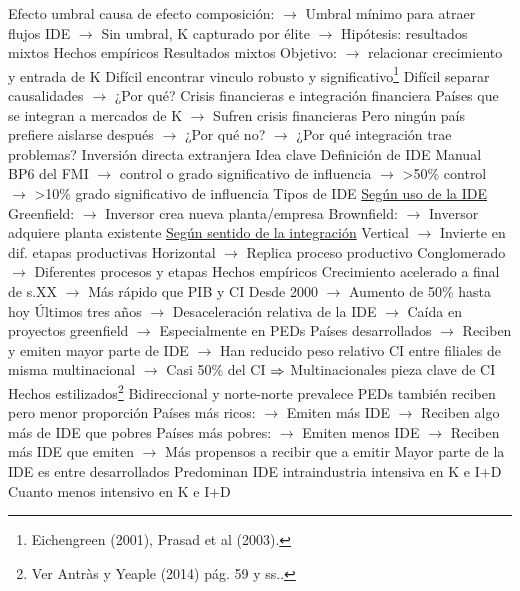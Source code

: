 \documentclass{nuevotema}
\begin{document}
\begin{esquemal}
				\4 Efecto umbral causa de efecto composición:
				\4[] $\to$ Umbral mínimo para atraer flujos IDE
				\4[] $\to$ Sin umbral, K capturado por élite
				\4[] $\to$ Hipótesis: resultados mixtos
			\3 Hechos empíricos
				\4 Resultados mixtos
				\4[] Objetivo:
				\4[] $\to$ relacionar crecimiento y entrada de K
				\4[] Difícil encontrar vinculo robusto y significativo\footnote{Eichengreen (2001), Prasad et al (2003).}
				\4 Difícil separar causalidades
				\4[] $\to$ ¿Por qué?
				\4 Crisis financieras e integración financiera
				\4[] Países que se integran a mercados de K
				\4[] $\to$ Sufren crisis financieras
				\4[] Pero ningún país prefiere aislarse después
				\4[] $\to$ ¿Por qué no?
				\4[] $\to$ ¿Por qué integración trae problemas?
		\2 Inversión directa extranjera
			\3 Idea clave
				\4 Definición de IDE
				\4[] Manual BP6 del FMI
				\4[] $\to$ control o grado significativo de influencia
				\4[] $\to$ >50\% control
				\4[] $\to$ >10\% grado significativo de influencia
				\4 Tipos de IDE
				\4[] \underline{Según uso de la IDE}
				\4[] Greenfield:
				\4[] $\to$ Inversor crea nueva planta/empresa
				\4[] Brownfield:
				\4[] $\to$ Inversor adquiere planta existente
				\4[] \underline{Según sentido de la integración}
				\4[] Vertical
				\4[] $\to$ Invierte en dif. etapas productivas
				\4[] Horizontal
				\4[] $\to$ Replica proceso productivo
				\4[] Conglomerado
				\4[] $\to$ Diferentes procesos y etapas
				\4 Hechos empíricos
				\4[] Crecimiento acelerado a final de s.XX
				\4[] $\to$ Más rápido que PIB y CI
				\4[] Desde 2000
				\4[] $\to$ Aumento de 50\% hasta hoy
				\4[] Últimos tres años
				\4[] $\to$ Desaceleración relativa de la IDE
				\4[] $\to$ Caída en proyectos greenfield
				\4[] $\to$ Especialmente en PEDs
				\4[] Países desarrollados
				\4[] $\to$ Reciben y emiten mayor parte de IDE
				\4[] $\to$ Han reducido peso relativo
				\4[] CI entre filiales de misma multinacional
				\4[] $\to$ Casi 50\% del CI
				\4[] $\Rightarrow$ Multinacionales pieza clave de CI
			\3 Hechos estilizados\footnote{Ver Antràs y Yeaple (2014) pág. 59 y ss..}
				\4[i] Bidireccional y norte-norte prevalece
				\4[] PEDs también reciben pero menor proporción
				\4[] Países más ricos:
				\4[] $\to$ Emiten más IDE
				\4[] $\to$ Reciben algo más de IDE que pobres
				\4[] Países más pobres:
				\4[] $\to$ Emiten menos IDE
				\4[] $\to$ Reciben más IDE que emiten
				\4[] $\to$ Más propensos a recibir que a emitir
				\4[] Mayor parte de la IDE es entre desarrollados
				\4[ii] Predominan IDE intraindustria intensiva en K e I+D
				\4[] Cuanto menos intensivo en K e I+D

\end{esquemal}
\end{document}
